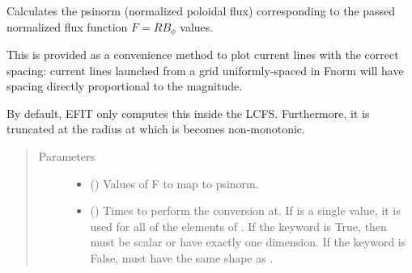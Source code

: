 \documentclass[letterpaper,10pt,english]{sphinxmanual}
\begin{document}
\begin{fulllineitems}
\begin{fulllineitems}
\begin{sphinxVerbatim}[commandchars=\\\{\}]
  \PYG{p}{[} \PYG{p}{]} \PYG{p}{[} \PYG{p}{]} 
\end{sphinxVerbatim}

\end{fulllineitems}


\begin{fulllineitems}
\label{\detokenize{eqtools:eqtools.core.Equilibrium.Fnorm2psinorm}}
Calculates the psinorm (normalized poloidal flux) corresponding to the passed normalized flux function \(F=RB_{\phi}\) values.

This is provided as a convenience method to plot current lines with the
correct spacing: current lines launched from a grid uniformly-spaced in
Fnorm will have spacing directly proportional to the magnitude.

By default, EFIT only computes this inside the LCFS. Furthermore, it is
truncated at the radius at which is becomes non-monotonic.
\begin{quote}\begin{description}
\item[{Parameters}] \leavevmode\begin{itemize}
\item {} 
 () \textendash{} Values of F to map to psinorm.

\item {} 
 () \textendash{} Times to perform the conversion at.
If  is a single value, it is used for all of the elements of
. If the  keyword is True, then  must be scalar
or have exactly one dimension. If the  keyword is False,
 must have the same shape as .


\end{itemize}
\end{description}
\end{quote}
\end{fulllineitems}
\end{fulllineitems}
\end{document}
